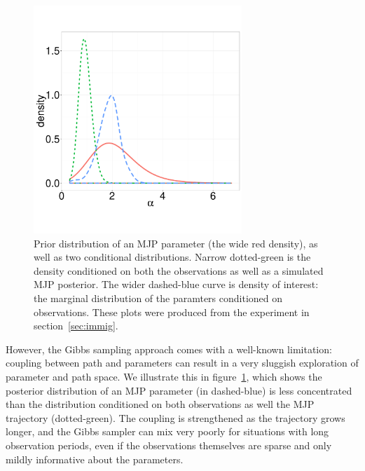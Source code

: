   \begin{figure}%
  \centering
  \begin{minipage}[hp]{0.44\linewidth}
  \centering
    \vspace{-0 in}
    \includegraphics [width=0.7\textwidth, angle=0]{figs/dist_beta.pdf}
    \vspace{0.1 in}
  \end{minipage}
  \begin{minipage}[hp]{0.55\linewidth}
    \vspace{-0.3 in}
  \caption{Prior distribution of an MJP parameter (the wide red density),
  as well as two conditional distributions. Narrow dotted-green is the
density conditioned on both the observations as well as a simulated
MJP posterior. The wider dashed-blue curve is density of interest: the
marginal distribution of the paramters conditioned on observations. These
plots were produced from the experiment in section~\ref{sec:immig}.}
     \label{fig:hist}
  \end{minipage}
    \vspace{-0.6 in}
  \end{figure}
  However, the Gibbs sampling approach %
  comes with a well-known limitation:
coupling between path and parameters can result in a very sluggish
exploration of parameter and path space. We illustrate this in figure~\ref{fig:hist},
which shows the posterior distribution of an MJP parameter (in dashed-blue)
is less concentrated than the distribution conditioned on both observations 
as well the MJP trajectory (dotted-green). 
The coupling is strengthened as the trajectory grows longer, and
the Gibbs sampler can mix very poorly for situations with
long observation periods, even if the observations themselves are
sparse and only mildly informative about the parameters.

